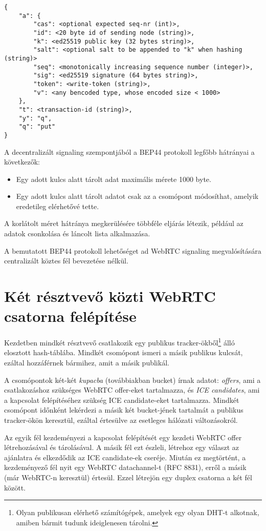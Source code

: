 \begin{lstlisting}[label={lst:lstlisting2}]
{
    "a": {
        "cas": <optional expected seq-nr (int)>,
        "id": <20 byte id of sending node (string)>,
        "k": <ed25519 public key (32 bytes string)>,
        "salt": <optional salt to be appended to "k" when hashing (string)>
        "seq": <monotonically increasing sequence number (integer)>,
        "sig": <ed25519 signature (64 bytes string)>,
        "token": <write-token (string)>,
        "v": <any bencoded type, whose encoded size < 1000>
    },
    "t": <transaction-id (string)>,
    "y": "q",
    "q": "put"
}
\end{lstlisting}

A decentralizált signaling szempontjából a BEP44 protokoll legfőbb hátrányai a következők:
\begin{itemize}
    \item Egy adott kulcs alatt tárolt adat maximális mérete 1000 byte.
    \item Egy adott kulcs alatt tárolt adatot csak az a csomópont módosíthat, amelyik eredetileg elérhetővé tette.
\end{itemize}

A korlátolt méret hátránya megkerülésére többféle eljárás létezik, például az adatok csonkolása és láncolt lista alkalmazása.

A bemutatott BEP44 protokoll lehetőséget ad WebRTC signaling megvalósítására centralizált köztes
fél bevezetése nélkül.


\section{Két résztvevő közti WebRTC csatorna felépítése}\label{sec:két-peer-közti-webrtc-csatorna-felépítése}

Kezdetben mindkét résztvevő csatlakozik egy publikus tracker-ökből\footnote{Olyan publikusan elérhető számítógépek,
    amelyek egy olyan DHT-t alkotnak, amiben bármit tudunk ideiglenesen tárolni.} álló elosztott hash-táblába.
Mindkét csomópont ismeri a másik publikus kulcsát, ezáltal hozzáférnek bármihez, amit a másik publikál.

A csomópontok két-két \emph{kupacba} (továbbiakban bucket) írnak adatot: \emph{offers}, ami a csatlakozáshoz szükséges
WebRTC offer-eket tartalmazza, és \emph{ICE candidates}, ami a kapcsolat felépítéséhez szükség ICE candidate-eket tartalmazza.
Mindkét csomópont időnként lekérdezi a másik két bucket-jének tartalmát a publikus tracker-ökön keresztül, ezáltal
értesülve az esetleges hálózati változásokról.

Az egyik fél kezdeményezi a kapcsolat felépítését egy kezdeti WebRTC offer létrehozásával és tárolásával.
A másik fél ezt észleli, létrehoz egy választ az ajánlatra és elkezdődik az ICE candidate-ek cseréje.
Miután ez megtörtént, a kezdeményező fél nyit egy WebRTC datachannel-t (RFC 8831\cite{RFC_8831}), erről a másik (már WebRTC-n keresztül) értesül.
Ezzel létrejön egy duplex csatorna a két fél között.
